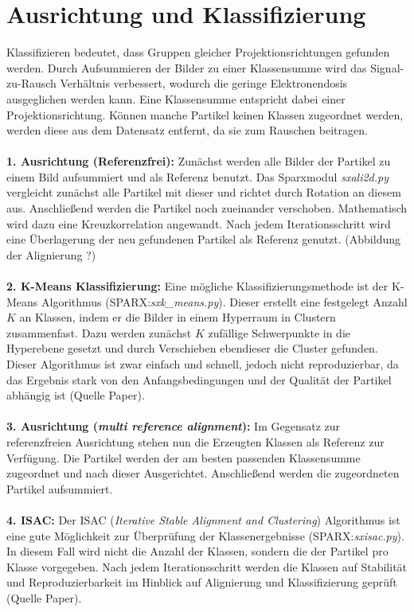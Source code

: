 \section{Ausrichtung und Klassifizierung} %
\label{sec:klassifizierung}

Klassifizieren bedeutet, dass Gruppen gleicher Projektionsrichtungen gefunden werden.
Durch Aufsummieren der Bilder zu einer Klassensumme wird das Signal-zu-Rausch Verhältnis verbessert, wodurch die geringe Elektronendosis ausgeglichen werden kann.
Eine Klassensumme entspricht dabei einer Projektionsrichtung.
Können manche Partikel keinen Klassen zugeordnet werden, werden diese aus dem Datensatz entfernt, da sie zum Rauschen beitragen.
\\
\\
\textbf{1. Ausrichtung (Referenzfrei):}
Zunächst werden alle Bilder der Partikel zu einem Bild aufsummiert und als Referenz benutzt.
Das Sparxmodul \textit{sxali2d.py} vergleicht zunächst alle Partikel mit dieser und richtet durch Rotation an diesem aus.
Anschließend werden die Partikel noch zueinander verschoben.
Mathematisch wird dazu eine Kreuzkorrelation angewandt.
Nach jedem Iterationsschritt wird eine Überlagerung der neu gefundenen Partikel als Referenz genutzt.
(Abbildung der Alignierung ?)
\\
\\
\textbf{2. K-Means Klassifizierung:}
Eine mögliche Klassifizierungsmethode ist der K-Means Algorithmus (SPARX:\textit{sxk\_means.py}).
Dieser erstellt eine festgelegt Anzahl $K$ an Klassen, indem er die Bilder in einem Hyperraum in Clustern zusammenfast.
Dazu werden zunächst $K$ zufällige Schwerpunkte in die Hyperebene gesetzt und durch Verschieben ebendieser die Cluster gefunden.
Dieser Algorithmus ist zwar einfach und schnell, jedoch nicht reproduzierbar, da das Ergebnis stark von den Anfangsbedingungen und der Qualität der Partikel abhängig ist (Quelle Paper).
\\ 
\\
\textbf{3. Ausrichtung (\textit{multi reference alignment}):}
Im Gegensatz zur referenzfreien Ausrichtung stehen nun die Erzeugten Klassen als Referenz zur Verfügung.
Die Partikel werden der am besten passenden Klassensumme zugeordnet und nach dieser Ausgerichtet.
Anschließend werden die zugeordneten Partikel aufsummiert.
\\ 
\\
\textbf{4. ISAC:}
Der ISAC (\textit{Iterative Stable Alignment and Clustering}) Algorithmus ist eine gute Möglichkeit zur Überprüfung der Klassenergebnisse (SPARX:\textit{sxisac.py}).
In diesem Fall wird nicht die Anzahl der Klassen, sondern die der Partikel pro Klasse vorgegeben.
Nach jedem Iterationsschritt werden die Klassen auf Stabilität und Reproduzierbarkeit im Hinblick auf Alignierung und Klassifizierung geprüft (Quelle Paper).
\FloatBarrier